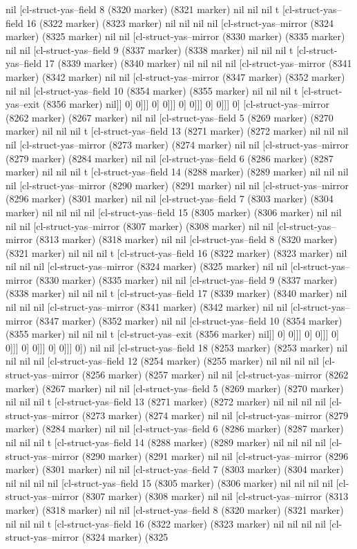 {{nil [cl-struct-yas--field 8 (8320 marker) (8321 marker) nil nil nil t [cl-struct-yas--field 16 (8322 marker) (8323 marker) nil nil nil nil [cl-struct-yas--mirror (8324 marker) (8325 marker) nil nil [cl-struct-yas--mirror (8330 marker) (8335 marker) nil nil [cl-struct-yas--field 9 (8337 marker) (8338 marker) nil nil nil t [cl-struct-yas--field 17 (8339 marker) (8340 marker) nil nil nil nil [cl-struct-yas--mirror (8341 marker) (8342 marker) nil nil [cl-struct-yas--mirror (8347 marker) (8352 marker) nil nil [cl-struct-yas--field 10 (8354 marker) (8355 marker) nil nil nil t [cl-struct-yas--exit (8356 marker) nil]] 0] 0]]] 0] 0]]] 0] 0]]] 0] 0]]] 0] [cl-struct-yas--mirror (8262 marker) (8267 marker) nil nil [cl-struct-yas--field 5 (8269 marker) (8270 marker) nil nil nil t [cl-struct-yas--field 13 (8271 marker) (8272 marker) nil nil nil nil [cl-struct-yas--mirror (8273 marker) (8274 marker) nil nil [cl-struct-yas--mirror (8279 marker) (8284 marker) nil nil [cl-struct-yas--field 6 (8286 marker) (8287 marker) nil nil nil t [cl-struct-yas--field 14 (8288 marker) (8289 marker) nil nil nil nil [cl-struct-yas--mirror (8290 marker) (8291 marker) nil nil [cl-struct-yas--mirror (8296 marker) (8301 marker) nil nil [cl-struct-yas--field 7 (8303 marker) (8304 marker) nil nil nil nil [cl-struct-yas--field 15 (8305 marker) (8306 marker) nil nil nil nil [cl-struct-yas--mirror (8307 marker) (8308 marker) nil nil [cl-struct-yas--mirror (8313 marker) (8318 marker) nil nil [cl-struct-yas--field 8 (8320 marker) (8321 marker) nil nil nil t [cl-struct-yas--field 16 (8322 marker) (8323 marker) nil nil nil nil [cl-struct-yas--mirror (8324 marker) (8325 marker) nil nil [cl-struct-yas--mirror (8330 marker) (8335 marker) nil nil [cl-struct-yas--field 9 (8337 marker) (8338 marker) nil nil nil t [cl-struct-yas--field 17 (8339 marker) (8340 marker) nil nil nil nil [cl-struct-yas--mirror (8341 marker) (8342 marker) nil nil [cl-struct-yas--mirror (8347 marker) (8352 marker) nil nil [cl-struct-yas--field 10 (8354 marker) (8355 marker) nil nil nil t [cl-struct-yas--exit (8356 marker) nil]] 0] 0]]] 0] 0]]] 0] 0]]] 0] 0]]] 0] 0]]] 0]) nil nil [cl-struct-yas--field 18 (8253 marker) (8253 marker) nil nil nil nil [cl-struct-yas--field 12 (8254 marker) (8255 marker) nil nil nil nil [cl-struct-yas--mirror (8256 marker) (8257 marker) nil nil [cl-struct-yas--mirror (8262 marker) (8267 marker) nil nil [cl-struct-yas--field 5 (8269 marker) (8270 marker) nil nil nil t [cl-struct-yas--field 13 (8271 marker) (8272 marker) nil nil nil nil [cl-struct-yas--mirror (8273 marker) (8274 marker) nil nil [cl-struct-yas--mirror (8279 marker) (8284 marker) nil nil [cl-struct-yas--field 6 (8286 marker) (8287 marker) nil nil nil t [cl-struct-yas--field 14 (8288 marker) (8289 marker) nil nil nil nil [cl-struct-yas--mirror (8290 marker) (8291 marker) nil nil [cl-struct-yas--mirror (8296 marker) (8301 marker) nil nil [cl-struct-yas--field 7 (8303 marker) (8304 marker) nil nil nil nil [cl-struct-yas--field 15 (8305 marker) (8306 marker) nil nil nil nil [cl-struct-yas--mirror (8307 marker) (8308 marker) nil nil [cl-struct-yas--mirror (8313 marker) (8318 marker) nil nil [cl-struct-yas--field 8 (8320 marker) (8321 marker) nil nil nil t [cl-struct-yas--field 16 (8322 marker) (8323 marker) nil nil nil nil [cl-struct-yas--mirror (8324 marker) (8325 }}
